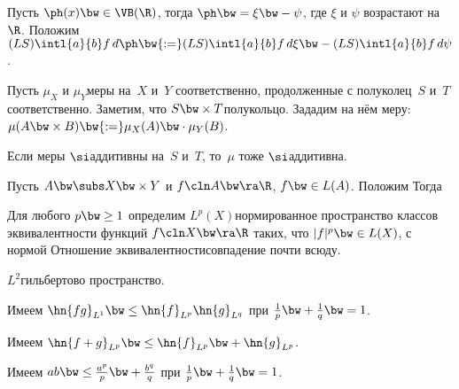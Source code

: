 \documentclass[a4paper]{article}
\begin{document}
\begin{df}
  Пусть $\ph(x) \bw\in \VB(\R)$, тогда $\ph \bw= \xi \bw- \psi$,
  где $\xi$ и $\psi$ возрастают на $\R$. Положим
  $(LS)\intl{a}{b}f\,d\ph \bw{:=} (LS) \intl{a}{b}f\,d\xi \bw-(LS)\intl{a}{b}f\,d\psi$.
\end{df}

\begin{df}
  Пусть $\mu_X$ и $\mu_Y$\т меры на~$X$ и~$Y$ соответственно, продолженные с полуколец~$S$ и~$T$
  соответственно. Заметим, что $S\bw\times T$\т полукольцо. Зададим на нём
  меру: $\mu(A\bw\times B) \bw{:=} \mu_X(A)\bw\cdot \mu_Y(B)$.
\end{df}

\begin{theorem}
  Если меры $\si$\д аддитивны на~$S$ и~$T$, то~$\mu$ тоже $\si$\д аддитивна.
\end{theorem}

\begin{theorem}[Фубини]
  Пусть $A \bw\subs X \bw\times Y$ и $f\cln A \bw\ra \R$, $f \bw\in L(A)$. Положим
  Тогда
\end{theorem}

\begin{df}
  Для любого $p\bw\ge1$ определим $L^p(X)$\т нормированное
  пространство классов эквивалентности функций $f\cln X\bw\ra \R$ таких, что $|f|^p \bw\in L(X)$,
  с нормой 
  Отношение эквивалентности\т совпадение почти всюду.
\end{df}

\begin{note}
  $L^2$\т гильбертово пространство.
\end{note}

\begin{theorem}
  Имеем $\hn{f g}_{L^1} \bw\le \hn{f}_{L^p} \hn{g}_{L^q}$ при $\frac1p \bw+ \frac1q \bw=1$.
\end{theorem}

\begin{theorem}
  Имеем $\hn{f+g}_{L^p} \bw\le \hn{f}_{L^p} \bw+ \hn{g}_{L^p}$.
\end{theorem}

\begin{theorem}
  Имеем $ab \bw \le\frac{a^p}p \bw+ \frac{b^q}q$ при $\frac1p \bw+ \frac1q \bw=1$.
\end{theorem}
\end{document}
